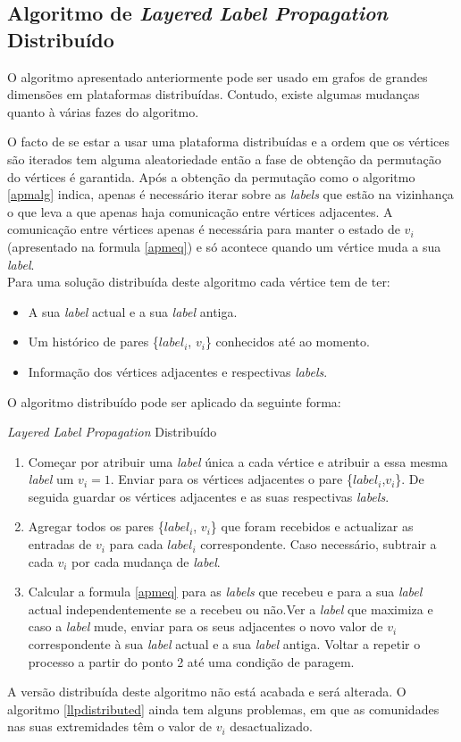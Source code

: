 \newpage
\subsection{Algoritmo de \textit{Layered Label Propagation} Distribuído}

O algoritmo apresentado anteriormente pode ser usado em grafos de grandes dimensões em plataformas distribuídas. Contudo, existe algumas mudanças quanto à várias fazes do algoritmo. 

  O facto de se estar a usar uma plataforma distribuídas e a ordem que os vértices são iterados tem alguma aleatoriedade então a fase de obtenção da permutação do vértices é garantida. Após a obtenção da permutação como o algoritmo \ref{apmalg} indica, apenas é necessário iterar sobre as \textit{labels} que estão na vizinhança o que leva a que apenas haja comunicação entre vértices adjacentes. A comunicação entre vértices apenas é necessária para manter o estado de $v_i$ (apresentado na formula \ref{apmeq}) e só acontece quando um vértice muda a sua \textit{label}.
  \\[0,25cm]
  Para uma solução distribuída deste algoritmo cada vértice tem de ter:
  \begin{itemize}
   \item A sua \textit{label} actual e a sua \textit{label} antiga.
   \item Um histórico de pares \{$label_i$, $v_i$\} conhecidos até ao momento.
   \item Informação dos vértices adjacentes e respectivas \textit{labels}. 
  \\[0,25cm]
  \end{itemize}
  
  O algoritmo distribuído pode ser aplicado da seguinte forma:
  \begin{algorithm}[H]
    \caption{\textit{Layered Label Propagation} Distribuído}\label{llpdistributed}
    \begin{enumerate}
      \item Começar por atribuir uma \textit{label} única a cada vértice e atribuir a essa mesma \textit{label} um $v_i=1$. Enviar para os vértices adjacentes o pare \{$label_i$,$v_i$\}. De seguida guardar os vértices adjacentes e as suas respectivas \textit{labels}.
      \item Agregar todos os pares \{$label_i$, $v_i$\} que foram recebidos e actualizar as entradas de $v_i$ para cada $label_i$ correspondente. Caso necessário, subtrair a cada $v_i$ por cada mudança de \textit{label}.
      \item Calcular a formula \ref{apmeq} para as \textit{labels} que recebeu e para a sua \textit{label} actual independentemente se a recebeu ou não.Ver a \textit{label} que maximiza e caso a \textit{label} mude, enviar para os seus adjacentes o novo valor de $v_i$ correspondente à sua \textit{label} actual e a sua \textit{label} antiga. Voltar a repetir o processo a partir do ponto 2 até uma condição de paragem.
    \end{enumerate}
  \end{algorithm}

  A versão distribuída deste algoritmo não está acabada e será alterada. O algoritmo \ref{llpdistributed} ainda tem alguns problemas, em que as comunidades nas suas extremidades têm o valor de $v_i$ desactualizado.